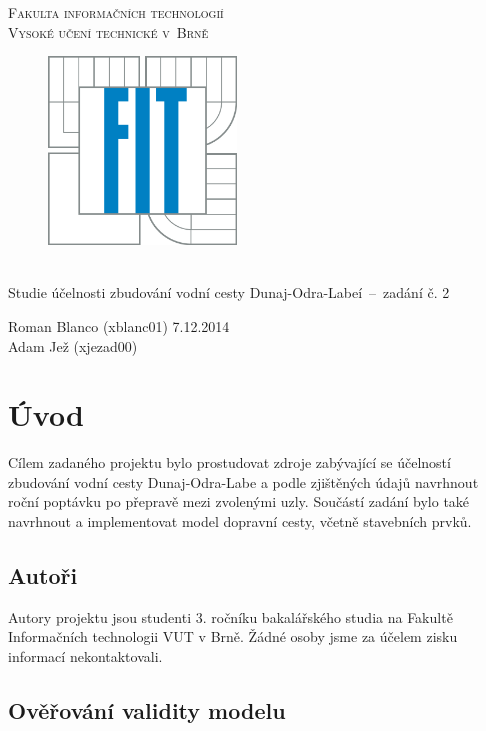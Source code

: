 \documentclass[11pt,a4paper]{report}
\begin{document}
  \begin{titlepage}
    \begin{center}
      \Huge
      \textsc{Fakulta informačních technologií \\ Vysoké učení technické v~Brně}
      \vspace{100px}
      \begin{figure}[!h]
        \centering
        \includegraphics[height=5cm]{logo}
      \end{figure}
      \\[50mm]
      \LARGE{Studie účelnosti zbudování vodní cesty Dunaj-Odra-Labeí \,--\, 
             zadání č. 2}
      \vfill
    \end{center}
    \Large{Roman Blanco (xblanc01) \hfill 7.12.2014 \\
           Adam Jež (xjezad00)}

  \end{titlepage}

  \section{Úvod}

    Cílem zadaného projektu bylo prostudovat zdroje zabývající se účelností
    zbudování vodní cesty Dunaj-Odra-Labe a podle zjištěných údajů navrhnout
    roční poptávku po přepravě mezi zvolenými uzly. Součástí zadání bylo také
    navrhnout a implementovat model dopravní cesty, včetně stavebních prvků.

    \subsection{Autoři}

      Autory projektu jsou studenti 3. ročníku bakalářského studia na Fakultě
      Informačních technologii VUT v Brně. Žádné osoby jsme za účelem zisku
      informací nekontaktovali.

    \subsection{Ověřování validity modelu}
\end{document}
